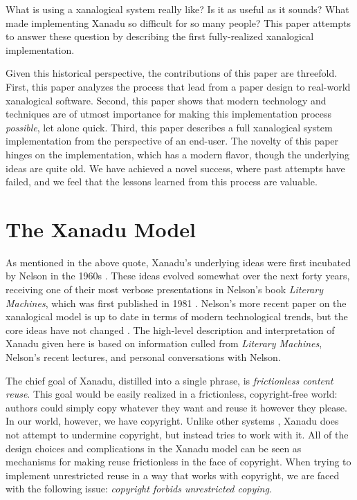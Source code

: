 \documentclass{acm_proc_article-sp}
\begin{document}
What is using a xanalogical system really like?
Is it as useful as it sounds?
What made implementing Xanadu so difficult for so many people?  
This paper attempts to answer these question by describing the first fully-realized xanalogical implementation.

Given this historical perspective, the contributions of this paper are threefold.
First, this paper analyzes the process that lead from a paper design to real-world xanalogical software.
Second, this paper shows that modern technology and techniques are of utmost importance for making this implementation process \textit{possible}, let alone quick.
Third, this paper describes a full xanalogical system implementation from the perspective of an end-user.
The novelty of this paper hinges on the implementation, which has a modern flavor, though the underlying ideas are quite old.
We have achieved a novel success, where past attempts have failed, and we feel that the lessons learned from this process are valuable.




\section{The Xanadu Model}

\label{sec:Xanadu}
As mentioned in the above quote, Xanadu's underlying ideas were first incubated by Nelson in the 1960s \cite{Nelson1965}.  
These ideas evolved somewhat over the next forty years, receiving one of their most verbose presentations in Nelson's book \textit{Literary Machines}, which was first published in 1981 \cite{NelsonLiteraryMachines}.  
Nelson's more recent paper on the xanalogical model is up to date in terms of modern technological trends, but the core ideas have not changed \cite{Nelson1999}.  
The high-level description and interpretation of Xanadu given here is based on information culled from \textit{Literary Machines}, Nelson's recent lectures, and personal conversations with Nelson.

The chief goal of Xanadu, distilled into a single phrase, is \textit{frictionless content reuse}.  
This goal would be easily realized in a frictionless, copyright-free world:  authors could simply copy whatever they want and reuse it however they please.  
In our world, however, we have copyright.
Unlike other systems \cite{Clark2000}, Xanadu does not attempt to undermine copyright, but instead tries to work with it. 
All of the design choices and complications in the Xanadu model can be seen as mechanisms for making reuse frictionless in the face of copyright.
When trying to implement unrestricted reuse in a way that works with copyright, we are faced with the following issue:  \textit{copyright forbids unrestricted copying}.
\end{document}

